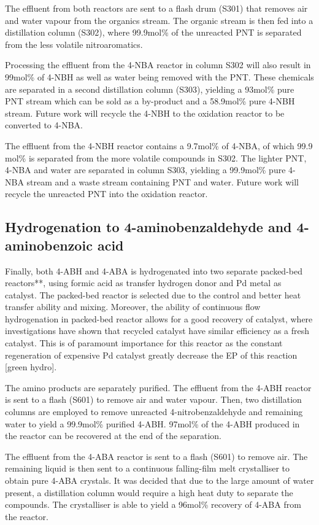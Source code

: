 The effluent from both reactors are sent to a flash drum (S301) that removes air and water vapour from the organics stream. The organic stream is then fed into a distillation column (S302), where 99.9mol\% of the unreacted PNT is separated from the less volatile nitroaromatics. 

Processing the effluent from the 4-NBA reactor in column S302 will also result in 99mol\% of 4-NBH as well as water being removed with the PNT. These chemicals are separated in a second distillation column (S303), yielding a 93mol\% pure PNT stream which can be sold as a by-product and a 58.9mol\% pure 4-NBH stream. Future work will recycle the 4-NBH to the oxidation reactor to be converted to 4-NBA.

The effluent from the 4-NBH reactor contains a 9.7mol\% of 4-NBA, of which 99.9 mol\% is separated from the more volatile compounds in S302. The lighter PNT,  4-NBA and water are separated in column S303, yielding a 99.9mol\% pure 4-NBA stream and a waste stream containing PNT and water. Future work will recycle the unreacted PNT into the oxidation reactor.

\subsection{Hydrogenation to 4-aminobenzaldehyde and 4-aminobenzoic acid}

Finally, both 4-ABH and 4-ABA is hydrogenated into two separate packed-bed reactors**, using formic acid as transfer hydrogen donor and Pd metal as catalyst. The packed-bed reactor is selected due to the control and better heat transfer ability and mixing. Moreover, the ability of continuous flow hydrogenation in packed-bed reactor allows for a good recovery of catalyst, where investigations have shown that recycled catalyst have similar efficiency as a fresh catalyst. This is of paramount importance for this reactor as the constant regeneration of expensive Pd catalyst greatly decrease the EP of this reaction [green hydro]. 

The amino products are separately purified. The effluent from the 4-ABH reactor is sent to a flash (S601) to remove air and water vapour.  Then, two distillation columns are employed to remove unreacted 4-nitrobenzaldehyde and remaining water to yield a 99.9mol\% purified 4-ABH. 97mol\% of the 4-ABH produced in the reactor can be recovered at the end of the separation.

The effluent from the 4-ABA reactor is sent to a flash (S601) to remove air. The remaining liquid is then sent to a continuous falling-film melt crystalliser to obtain pure 4-ABA crystals. It was decided that due to the large amount of water present, a distillation column would require a high heat duty to separate the compounds. The crystalliser is able to yield a 96mol\% recovery of 4-ABA from the reactor.

